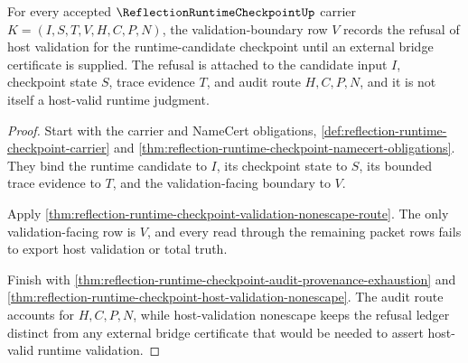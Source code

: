 \begin{theorem}
\label{thm:reflection-runtime-checkpoint-runtime-candidate-validation-refusal-ledger}
For every accepted $\ReflectionRuntimeCheckpointUp$ carrier $K=(I,S,T,V,H,C,P,N)$, the validation-boundary row $V$ records the refusal of host validation for the runtime-candidate checkpoint until an external bridge certificate is supplied. The refusal is attached to the candidate input $I$, checkpoint state $S$, trace evidence $T$, and audit route $H,C,P,N$, and it is not itself a host-valid runtime judgment.
\end{theorem}
\begin{proof}
Start with the carrier and NameCert obligations, \autoref{def:reflection-runtime-checkpoint-carrier} and \autoref{thm:reflection-runtime-checkpoint-namecert-obligations}. They bind the runtime candidate to $I$, its checkpoint state to $S$, its bounded trace evidence to $T$, and the validation-facing boundary to $V$.

Apply \autoref{thm:reflection-runtime-checkpoint-validation-nonescape-route}. The only validation-facing row is $V$, and every read through the remaining packet rows fails to export host validation or total truth.

Finish with \autoref{thm:reflection-runtime-checkpoint-audit-provenance-exhaustion} and \autoref{thm:reflection-runtime-checkpoint-host-validation-nonescape}. The audit route accounts for $H,C,P,N$, while host-validation nonescape keeps the refusal ledger distinct from any external bridge certificate that would be needed to assert host-valid runtime validation.
\end{proof}

